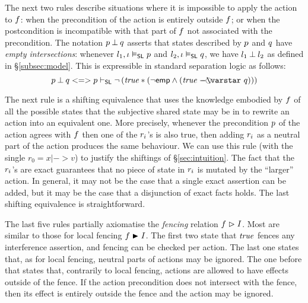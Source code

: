 The next two rules describe situations where  it is impossible to apply the
action to $\lass{F}$: when the precondition  of the action is
entirely outside  $\lass{F}$; or when the postcondition is
incompatible  with that part of  $\lass{F} $ not associated with the
precondition. 
The notation $\separate{\lass{P}}{\lass{Q}}$ asserts that
states described by $\lass{P}$ and $\lass{Q}$ have \emph{empty
  intersections}: whenever $l_1, \lenv \slsat \lass{P}$ and $l_2,
\lenv \slsat \lass{Q}$, we have $l_1 \mathbin{\bot} l_2$ as defined in \S\ref{subsec:model}. This is expressible in standard separation logic as follows:
\[
\separate{\lass{P}}{\lass{Q}} <=> \lass{P} \slentails \neg\left( \m{true} * (\neg\emp \land (\m{true} \septraction \lass{Q}) ) \right)
\]

The next rule is a shifting equivalence that uses the
knowledge embodied by $\lass{F}$ of all the possible states that the
subjective shared state may be in to rewrite an action into an
equivalent one. More precisely, whenever the precondition
$\lass{P}$ of the action agrees with $\lass{F}$ then one of the
$\lass{R}_i$'s is also true, then adding $\lass{R}_i$ as a neutral
part of the action produces the same behaviour. We can use this rule
(with the single $r_0 = x|->v$) to justify the shiftings of
\S\ref{sec:intuition}. The fact that the $\lass{R}_i$'s are exact
guarantees that no piece of state in $\lass{R}_i$ is mutated by the
``larger'' action.  In general, it may not be the case that a
single exact assertion can be added, but it may be the case that a
disjunction of exact facts holds. The last shifting equivalence is
straightforward.

The last five rules partially axiomatise the \emph{fencing} relation
 $\lass{F}\fences I$. Most are similar to those for local
fencing  $\lass{F}\strictfences I$. The first two state that
$\mathit{true}$ fences any interference assertion, and fencing can be
checked per action. The last one states that, as for local fencing,
neutral parts of actions may be ignored. The one before that states
that, contrarily to local fencing, actions are allowed to have effects
outside of the fence. If the action precondition does not intersect
with the fence, then its effect is entirely outside the fence and
the action may be ignored.

